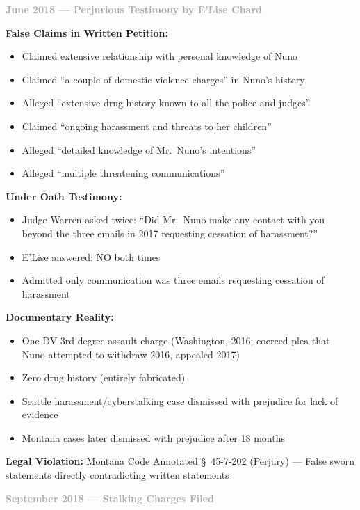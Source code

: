 \documentclass[11pt, letterpaper]{article}
\newcommand{\subsubsectiontitle}[1]{\vspace{0.1in}\noindent\textcolor{DarkGray}{\textbf{#1}}\vspace{0.05in}}
\begin{document}
\subsubsectiontitle{June 2018 --- Perjurious Testimony by E'Lise Chard}

\textbf{False Claims in Written Petition:}
\begin{itemize}[leftmargin=*,itemsep=2pt]
    \item Claimed extensive relationship with personal knowledge of Nuno
    \item Claimed ``a couple of domestic violence charges'' in Nuno's history
    \item Alleged ``extensive drug history known to all the police and judges''
    \item Claimed ``ongoing harassment and threats to her children''
    \item Alleged ``detailed knowledge of Mr.\ Nuno's intentions''
    \item Alleged ``multiple threatening communications''
\end{itemize}

\textbf{Under Oath Testimony:}
\begin{itemize}[leftmargin=*,itemsep=2pt]
    \item Judge Warren asked twice: ``Did Mr.\ Nuno make any contact with you beyond the three emails in 2017 requesting cessation of harassment?''
    \item E'Lise answered: NO both times
    \item Admitted only communication was three emails requesting cessation of harassment
\end{itemize}

\textbf{Documentary Reality:}
\begin{itemize}[leftmargin=*,itemsep=2pt]
    \item One DV 3rd degree assault charge (Washington, 2016; coerced plea that Nuno attempted to withdraw 2016, appealed 2017)
    \item Zero drug history (entirely fabricated)
    \item Seattle harassment/cyberstalking case dismissed with prejudice for lack of evidence
    \item Montana cases later dismissed with prejudice after 18 months
\end{itemize}

\textbf{Legal Violation:} Montana Code Annotated \S\ 45-7-202 (Perjury) --- False sworn statements directly contradicting written statements

\subsubsectiontitle{September 2018 --- Stalking Charges Filed}
\end{document}
